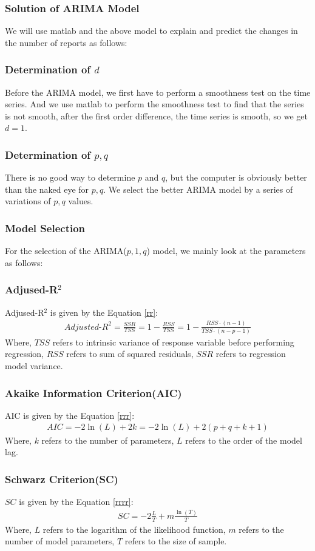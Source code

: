 \documentclass[12pt]{article}  %
\begin{document}
\subsubsection{Solution of ARIMA Model}
We will use matlab and the above model to explain and predict the changes in the number of reports as follows:
\subsubsection*{Determination of $d$}
Before the ARIMA model, we first have to perform a smoothness test on the time series. And we use matlab to perform the smoothness test to find that the series is not smooth, after the first order difference, the time series is smooth, so we get $d=1$.
\subsubsection*{Determination of $p,q$}
There is no good way to determine $p$ and $q$, but the computer is obviously better than the naked eye for $p,q$. We select the better ARIMA model by a series of variations of $p,q$ values.
\subsubsection{Model Selection}
For the selection of the ARIMA($p,1,q$) model, we mainly look at the parameters as follows:
\subsubsection*{\textbf{Adjused-R}$^2$}
Adjused-R$^2$ is given by the Equation \ref{rr}:
\begin{eqnarray}
	Adjusted\mbox{-}R^2=\frac{SSR}{TSS}=1-\frac{RSS}{TSS}=1-\frac{RSS\cdot(n-1)}{TSS\cdot(n-p-1)}\label{rr}
\end{eqnarray}
Where, $TSS$ refers to intrinsic variance of response variable before performing regression, $RSS$ refers to sum of squared residuals, $SSR$ refers to regression model variance.
\subsubsection*{Akaike Information Criterion(AIC)}
AIC is given by the Equation \ref{rrr}:
\begin{eqnarray}
	AIC=-2\ln(L)+2k=-2\ln(L)+2(p+q+k+1)\label{rrr}
\end{eqnarray}
Where, $k$ refers to the number of parameters, $L$ refers to the order of the model lag.
\subsubsection*{Schwarz Criterion(SC)}
$SC$ is given by the Equation \ref{rrrr}:
\begin{eqnarray}
	SC=-2\frac{L}{T}+m\frac{\ln(T)}{T}\label{rrrr}
\end{eqnarray}
Where, $L$ refers to the logarithm of the likelihood function, $m$ refers to the number of model parameters, $T$ refers to the size of sample.
\end{document}

